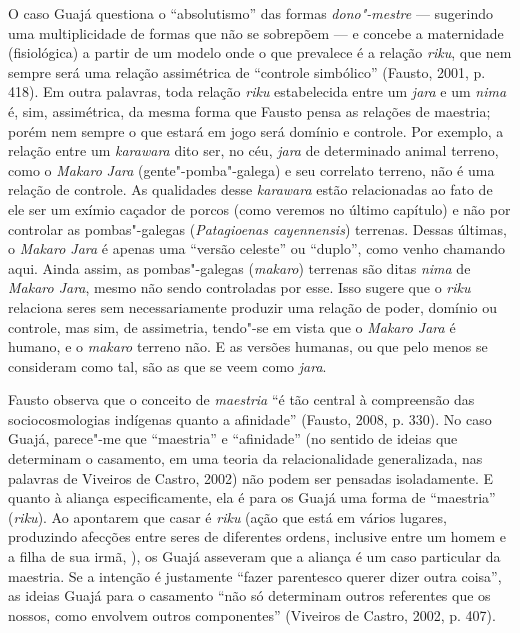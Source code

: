 O caso Guajá questiona o ``absolutismo'' das formas \emph{dono"-mestre} ---
sugerindo uma multiplicidade de formas que não se sobrepõem --- e concebe
a maternidade (fisiológica) a partir de um modelo onde o que prevalece é
a relação \emph{riku}, que nem sempre será uma relação assimétrica de
``controle simbólico'' (Fausto, 2001, p. 418). Em outra palavras, toda
relação \emph{riku} estabelecida entre um \emph{jara} e um \emph{nima}
é, sim, assimétrica, da mesma forma que Fausto pensa as relações de
maestria; porém nem sempre o que estará em jogo será domínio e controle.
Por exemplo, a relação entre um \emph{karawara} dito ser, no céu,
\emph{jara} de determinado animal terreno, como o \emph{Makaro}
\emph{Jara} (gente"-pomba"-galega) e seu correlato terreno, não é uma
relação de controle. As qualidades desse \emph{karawara} estão
relacionadas ao fato de ele ser um exímio caçador de porcos (como
veremos no último capítulo) e não por controlar as pombas"-galegas
(\emph{Patagioenas cayennensis}) terrenas. Dessas últimas, o
\emph{Makaro Jara} é apenas uma ``versão celeste'' ou ``duplo'', como venho
chamando aqui. Ainda assim, as pombas"-galegas (\emph{makaro}) terrenas
são ditas \emph{nima} de \emph{Makaro Jara}, mesmo não sendo controladas
por esse. Isso sugere que o \emph{riku} relaciona seres sem
necessariamente produzir uma relação de poder, domínio ou controle, mas
sim, de assimetria, tendo"-se em vista que o \emph{Makaro Jara} é humano,
e o \emph{makaro} terreno não. E as versões humanas, ou que pelo menos
se consideram como tal, são as que se veem como \emph{jara}.

Fausto observa que o conceito de \emph{maestria} ``é tão central à
compreensão das sociocosmologias indígenas quanto a afinidade'' (Fausto,
2008, p. 330). No caso Guajá, parece"-me que ``maestria'' e ``afinidade''
(no sentido de ideias que determinam o casamento, em uma teoria da
relacionalidade generalizada, nas palavras de Viveiros de Castro, 2002)
não podem ser pensadas isoladamente. E quanto à aliança especificamente,
ela é para os Guajá uma forma de ``maestria'' (\emph{riku}). Ao apontarem
que casar é \emph{riku} (ação que está em vários lugares, produzindo
afecções entre seres de diferentes ordens, inclusive entre um homem e a
filha de sua irmã, ), os Guajá asseveram que a aliança é um caso
particular da maestria. Se a intenção é justamente ``fazer parentesco
querer dizer outra coisa'', as ideias Guajá para o casamento ``não só
determinam outros referentes que os nossos, como envolvem outros
componentes'' (Viveiros de Castro, 2002, p. 407).

